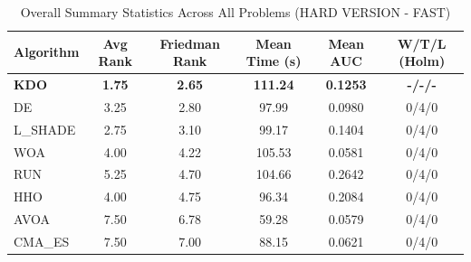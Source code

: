 \begin{table}[htbp]
\centering
\caption{Overall Summary Statistics Across All Problems (HARD VERSION - FAST)}
\label{tab:summary}
\small
\begin{tabular}{lccccc}
\toprule
\textbf{Algorithm} & \textbf{Avg Rank} & \textbf{Friedman Rank} & \textbf{Mean Time (s)} & \textbf{Mean AUC} & \textbf{W/T/L (Holm)} \\
\midrule
\textbf{KDO} & \textbf{1.75} & \textbf{2.65} & \textbf{111.24} & \textbf{0.1253} & \textbf{-/-/-} \\
DE & 3.25 & 2.80 & 97.99 & 0.0980 & 0/4/0 \\
L_SHADE & 2.75 & 3.10 & 99.17 & 0.1404 & 0/4/0 \\
WOA & 4.00 & 4.22 & 105.53 & 0.0581 & 0/4/0 \\
RUN & 5.25 & 4.70 & 104.66 & 0.2642 & 0/4/0 \\
HHO & 4.00 & 4.75 & 96.34 & 0.2084 & 0/4/0 \\
AVOA & 7.50 & 6.78 & 59.28 & 0.0579 & 0/4/0 \\
CMA_ES & 7.50 & 7.00 & 88.15 & 0.0621 & 0/4/0 \\
\bottomrule
\end{tabular}
\end{table}
